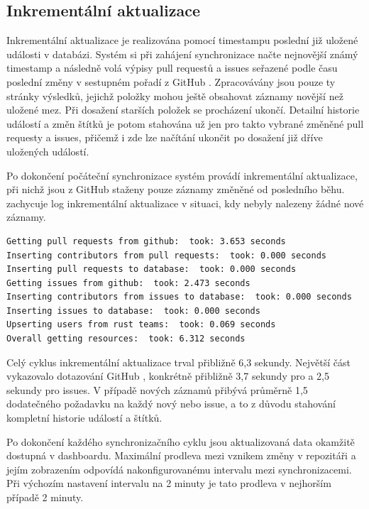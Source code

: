 \subsection{Inkrementální aktualizace}
\label{sec:evaluace:benchmarks:inkrementalni}

Inkrementální aktualizace je realizována pomocí timestampu poslední již uložené události v databázi. Systém si při zahájení synchronizace načte nejnovější známý timestamp a následně volá výpisy pull requestů a issues seřazené podle času poslední změny v sestupném pořadí z GitHub \API. Zpracovávány jsou pouze ty stránky výsledků, jejichž položky mohou ještě obsahovat záznamy novější než uložené mez.
Při dosažení starších položek se procházení ukončí.
Detailní historie událostí a změn štítků je potom stahována už jen pro takto vybrané změněné pull requesty a issues, přičemž i zde lze načítání ukončit po dosažení již dříve uložených událostí.

Po dokončení počáteční synchronizace systém provádí inkrementální aktualizace, při nichž jsou z GitHub \API staženy pouze záznamy změněné od posledního běhu.
 zachycuje log inkrementální aktualizace v situaci, kdy nebyly nalezeny žádné nové záznamy.

\begin{listing}[h]
\begin{verbatim}
Getting pull requests from github:  took: 3.653 seconds
Inserting contributors from pull requests:  took: 0.000 seconds
Inserting pull requests to database:  took: 0.000 seconds
Getting issues from github:  took: 2.473 seconds
Inserting contributors from issues to database:  took: 0.000 seconds
Inserting issues to database:  took: 0.000 seconds
Upserting users from rust teams:  took: 0.069 seconds
Overall getting resources:  took: 6.312 seconds
\end{verbatim}
  \caption{Log inkrementální aktualizace bez nových záznamů}
  \label{lst:evaluace:benchmarks:inkrementalni}
\end{listing}

Celý cyklus inkrementální aktualizace trval přibližně 6,3 sekundy.
Největší část vykazovalo dotazování GitHub \API, konkrétně přibližně 3,7 sekundy pro \PR a 2,5 sekundy pro issues.
V případě nových záznamů přibývá průměrně 1,5 dodatečného \API požadavku na každý nový \PR nebo issue, a to z důvodu stahování kompletní historie událostí a štítků.

Po dokončení každého synchronizačního cyklu jsou aktualizovaná data okamžitě dostupná v dashboardu.
Maximální prodleva mezi vznikem změny v repozitáři a jejím zobrazením odpovídá nakonfigurovanému intervalu mezi synchronizacemi.
Při výchozím nastavení intervalu na 2 minuty je tato prodleva v nejhorším případě 2 minuty.

